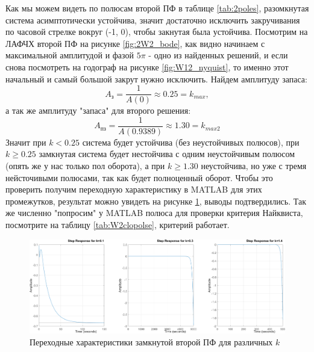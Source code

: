 Как мы можем видеть по полюсам второй ПФ в таблице \ref{tab:2poles},
разомкнутая система асимптотически устойчива, значит достаточно исключить 
закручивания по часовой стрелке вокруг (-1, 0), чтобы закнутая была устойчива.
Посмотрим на ЛАФЧХ второй ПФ на рисунке \ref{fig:2W2_bode}, как видно начинаем
с максимальной амплитудой и фазой $5\pi$ - одно из найденных решений, и если снова
посмотреть на годограф на рисунке \ref{fig:W12_nyquist}, то именно этот начальный и самый
большой закрут нужно исключить. Найдем
амплитуду запаса:
\begin{equation*}
    A_\text{з}=\frac{1}{A(0)}\approx 0.25=k_{max},
\end{equation*}
а так же амплитуду "запаса" для второго решения:
\begin{equation*}
    A_\text{пз}=\frac{1}{A(0.9389)}\approx 1.30=k_{max2}
\end{equation*}
Значит при $k<0.25$ система будет устойчива (без неустойчивых полюсов), при $k\geq 0.25$ замкнутая система будет 
нестойчива с одним неустойчивым полюсом (опять же у нас только пол оборота), а при $k\geq1.30$ неустойчива, 
но уже с тремя нейсточивыми
полюсами, так как будет полноценный оборот. Чтобы это проверить получим переходную характеристику
в MATLAB для этих промежутков, результат можно увидеть на рисунке \ref{fig:W2_step},
выводы подтвердились. Так же численно "попросим" у MATLAB полюса для проверки критерия
Найквиста, посмотрите на таблицу \ref{tab:W2clopolse}, критерий работает.

\begin{figure}[H]
    \centering
    \includegraphics[width=\textwidth]{figs/task_2_W2_ksteps.png}
    \caption{Переходные характеристики замкнутой второй ПФ для различных $k$}
    \label{fig:W2_step}
\end{figure}

